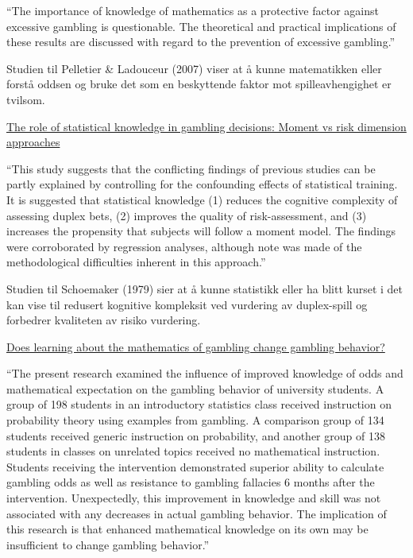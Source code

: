 \documentclass[
  12pt,
  a4paper,
  DIV=11,
  numbers=noendperiod]{scrartcl}
\begin{document}
``The importance of knowledge of mathematics as a protective factor
against excessive gambling is questionable. The theoretical and
practical implications of these results are discussed with regard to the
prevention of excessive gambling.''

Studien til Pelletier \& Ladouceur (2007) viser at å kunne matematikken
eller forstå oddsen og bruke det som en beskyttende faktor mot
spilleavhengighet er tvilsom.

\href{https://www.sciencedirect.com/science/article/pii/0030507379900114}{The
role of statistical knowledge in gambling decisions: Moment vs risk
dimension approaches}

``This study suggests that the conflicting findings of previous studies
can be partly explained by controlling for the confounding effects of
statistical training. It is suggested that statistical knowledge (1)
reduces the cognitive complexity of assessing duplex bets, (2) improves
the quality of risk-assessment, and (3) increases the propensity that
subjects will follow a moment model. The findings were corroborated by
regression analyses, although note was made of the methodological
difficulties inherent in this approach.''

Studien til Schoemaker (1979) sier at å kunne statistikk eller ha blitt
kurset i det kan vise til redusert kognitive kompleksit ved vurdering av
duplex-spill og forbedrer kvaliteten av risiko vurdering.

\href{https://psycnet.apa.org/record/2006-03168-007}{Does learning about
the mathematics of gambling change gambling behavior?}

``The present research examined the influence of improved knowledge of
odds and mathematical expectation on the gambling behavior of university
students. A group of 198 students in an introductory statistics class
received instruction on probability theory using examples from gambling.
A comparison group of 134 students received generic instruction on
probability, and another group of 138 students in classes on unrelated
topics received no mathematical instruction. Students receiving the
intervention demonstrated superior ability to calculate gambling odds as
well as resistance to gambling fallacies 6 months after the
intervention. Unexpectedly, this improvement in knowledge and skill was
not associated with any decreases in actual gambling behavior. The
implication of this research is that enhanced mathematical knowledge on
its own may be insufficient to change gambling behavior.''
\end{document}
